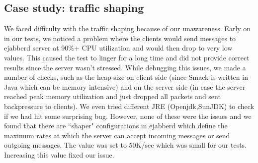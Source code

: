 \documentclass[a4paper, twocolumn]{article}
\begin{document}
\subsection{Case study: traffic shaping}
We faced difficulty with the traffic shaping because of our unawareness. Early on in our tests, we noticed a problem where the clients would send messages to ejabberd server at 90\%+ CPU utilization and would then drop to very low values. This caused the test to linger for a long time and did not provide correct results since the server wasn't stressed. While debugging this issues, we made a number of checks, such as the heap size on client side (since Smack is written in Java which can be memory intensive) and on the server side (in case the server reached peak memory utilization and just dropped all packets and sent backpressure to clients). We even tried different JRE (Openjdk,SunJDK) to check if we had hit some surprising bug. However, none of these were the issues and we found that there are ``shaper" configurations in ejabberd which define the maximum rates at which the server can accept incoming messages or send outgoing messages. The value was set to 50K/sec which was small for our tests. Increasing this value fixed our issue. 
\end{document}
